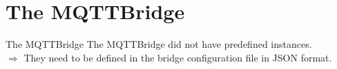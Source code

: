 ﻿\section[nosectionpage]{The MQTTBridge}

\begin{frame}{The MQTTBridge}
The MQTTBridge did not have predefined instances.\\
$\Rightarrow$ They need to be defined in the bridge configuration file in JSON format.
\end{frame}

